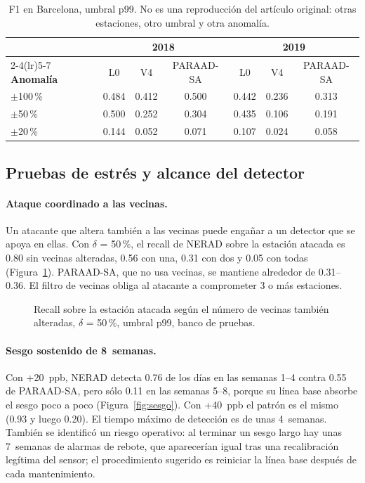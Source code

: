 \documentclass[11pt, letterpaper]{article}
\newcommand{\figurapresentacion}[1]{%
  \adjustbox{max width=\linewidth}{}}
\begin{document}
\begin{table}[H]
  \centering
  \small
  \caption{F1 en Barcelona, umbral p99. No es una reproducción del artículo original:
    otras estaciones, otro umbral y otra anomalía.}
  \label{tab:barcelona}
  \begin{tabular}{@{}l ccc ccc@{}}
    \toprule
    & \multicolumn{3}{c}{\textbf{2018}} & \multicolumn{3}{c}{\textbf{2019}} \\
    \cmidrule(lr){2-4}\cmidrule(lr){5-7}
    \textbf{Anomalía} & L0 & V4 & PARAAD-SA & L0 & V4 & PARAAD-SA \\
    \midrule
    $\pm$100\,\% & 0.484 & 0.412 & 0.500 & 0.442 & 0.236 & 0.313 \\
    $\pm$50\,\%  & 0.500 & 0.252 & 0.304 & 0.435 & 0.106 & 0.191 \\
    $\pm$20\,\%  & 0.144 & 0.052 & 0.071 & 0.107 & 0.024 & 0.058 \\
    \bottomrule
  \end{tabular}
\end{table}

\subsection{Pruebas de estrés y alcance del detector}
\label{sec:estres}

\paragraph{Ataque coordinado a las vecinas.} Un atacante que altera también a las vecinas
puede engañar a un detector que se apoya en ellas. Con $\delta$ = 50\,\%, el recall de
NERAD sobre la estación atacada es 0.80 sin vecinas alteradas, 0.56 con una, 0.31 con dos
y 0.05 con todas (Figura~\ref{fig:vecinas}). PARAAD-SA, que no usa vecinas, se mantiene
alrededor de 0.31--0.36. El filtro de vecinas obliga al atacante a comprometer 3 o más
estaciones.

\begin{figure}[H]
  \centering
  \figurapresentacion{vecinas_coordinadas}
  \caption{Recall sobre la estación atacada según el número de vecinas también alteradas,
    $\delta$ = 50\,\%, umbral p99, banco de pruebas.}
  \label{fig:vecinas}
\end{figure}

\paragraph{Sesgo sostenido de 8~semanas.} Con +20~ppb, NERAD detecta 0.76 de los días en
las semanas 1--4 contra 0.55 de PARAAD-SA, pero sólo 0.11 en las semanas 5--8, porque su
línea base absorbe el sesgo poco a poco (Figura~\ref{fig:sesgo}). Con +40~ppb el patrón
es el mismo (0.93 y luego 0.20). El tiempo máximo de detección es de unas 4~semanas.
También se identificó un riesgo operativo: al terminar un sesgo largo hay unas 7~semanas
de alarmas de rebote, que aparecerían igual tras una recalibración legítima del sensor;
el procedimiento sugerido es reiniciar la línea base después de cada mantenimiento.
\end{document}
